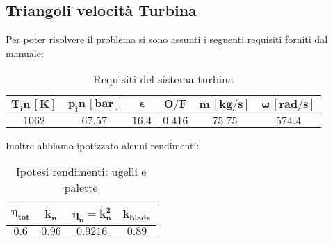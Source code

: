 

\subsection{Triangoli velocità Turbina}
Per poter risolvere il problema si sono assunti i seguenti requisiti forniti dal manuale:
\begin{table}[H]

\centering
\begin{tabular}{|c|c|c|c|c|c|}
\hline
$\bm{T_in \, [K]}$ & $\bm{p_in \, [bar]}$ & $\bm{\epsilon}$ &  $\bm{O/F}$ & $\bm{\dot{m} \, [kg/s]}$ & $\bm{\omega \, [rad/s]}$  \\
\hline
$1062$ & $67.57$ & $16.4$ &  $0.416$ & $75.75$ & $574.4$ \\
\hline
\end{tabular}

\caption{Requisiti del sistema turbina}
\label{table:turbine}

\end{table}

Inoltre abbiamo ipotizzato alcuni rendimenti:

\begin{table}[H]

\centering
\begin{tabular}{|c|c|c|c|}
\hline
$\bm{\eta_{tot}}$ & $\bm{k_n}$ & $\bm{\eta_n = k_n ^2}$ &  $\bm{k_{blade}}$   \\
\hline
$0.6$ & $0.96$ & $0.9216$ &  $0.89$ \\
\hline
\end{tabular}

\caption{Ipotesi rendimenti: ugelli e palette}
\label{table:rendimenti turbina}
\end{table}


